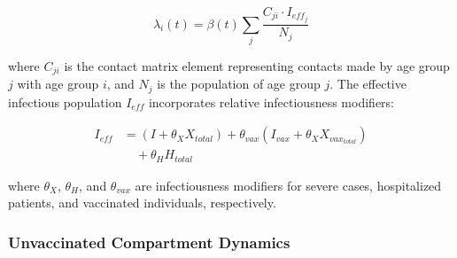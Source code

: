 \documentclass[10pt,twocolumn]{article}
\begin{document}
\begin{equation*}
\lambda_i(t) = \beta(t) \sum_j \frac{C_{ji} \cdot I_{eff_{j}}}{N_j}
\end{equation*}

where $C_{ji}$ is the contact matrix element representing contacts made by age group $j$ with age group $i$, and $N_j$ is the population of age group $j$. The effective infectious population $I_{eff}$ incorporates relative infectiousness modifiers:

\begin{align*}
I_{eff} &= (I + \theta_X X_{total}) + \theta_{vax}(I_{vax} + \theta_X X_{vax_{total}}) \nonumber \\
&\quad + \theta_H H_{total}
\end{align*}
    
where $\theta_X$, $\theta_H$, and $\theta_{vax}$ are infectiousness modifiers for severe cases, hospitalized patients, and vaccinated individuals, respectively.

\subsubsection{Unvaccinated Compartment Dynamics}
\end{document}
